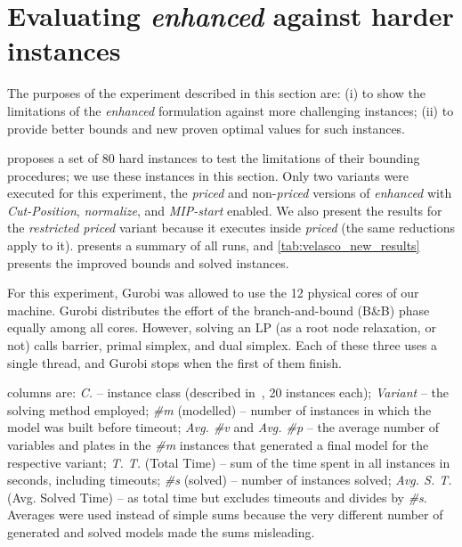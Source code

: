 \documentclass[ppgc,prop-tese,english,formais,babel]{iiufrgs}
\begin{document}
\section{Evaluating \emph{enhanced} against harder instances}
\label{sec:new_results}

The purposes of the experiment described in this section are:
(i) to show the limitations of the \emph{enhanced} formulation against more challenging instances;
(ii) to provide better bounds and new proven optimal values for such instances.

\citet{velasco:2019} proposes a set of 80 hard instances to test the limitations of their bounding procedures; we use these instances in this section.
Only two variants were executed for this experiment, the \emph{priced} and non-\emph{priced} versions of \emph{enhanced} with \emph{Cut-Position}, \emph{normalize}, and \emph{MIP-start} enabled.
We also present the results for the \emph{restricted priced} variant because it executes inside \emph{priced} (the same reductions apply to it).
 presents a summary of all runs, and \cref{tab:velasco_new_results} presents the improved bounds and solved instances.

For this experiment, Gurobi was allowed to use the 12 physical cores of our machine.
Gurobi distributes the effort of the branch-and-bound (B\&B) phase equally among all cores.
However, solving an LP (as a root node relaxation, or not) calls barrier, primal simplex, and dual simplex.
Each of these three uses a single thread, and Gurobi stops when the first of them finish.

 columns are:
\emph{C.} -- instance class (described in~\citet{velasco:2019}, 20 instances each);
\emph{Variant} -- the solving method employed;
\emph{\#m} (modelled) -- number of instances in which the model was built before timeout;
\emph{Avg. \#v} and \emph{Avg. \#p} -- the average number of variables and plates in the \emph{\#m} instances that generated a final model for the respective variant;
\emph{T. T.} (Total Time) -- sum of the time spent in all instances in seconds, including timeouts;
\emph{\#s} (solved) -- number of instances solved;
\emph{Avg. S. T.} (Avg. Solved Time) -- as total time but excludes timeouts and divides by \emph{\#s}.
Averages were used instead of simple sums because the very different number of generated and solved models made the sums misleading.
\end{document}
